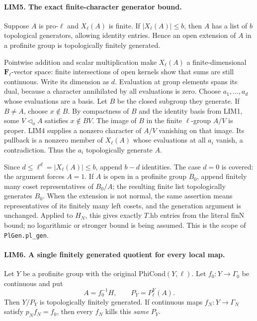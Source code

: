 \paragraph{LIM5. The exact finite-character generator bound.}
\label{claim:LIM5}
Suppose \(A\) is pro-\(\ell\) and \(X_\ell(A)\) is finite.  If
\(|X_\ell(A)|\le b\), then \(A\) has a list of \(b\) topological
generators, allowing identity entries.  Hence an open extension of
\(A\) in a profinite group is topologically finitely generated.

Pointwise addition and scalar multiplication make \(X_\ell(A)\) a
finite-dimensional \(\mathbf F_\ell\)-vector space: finite
intersections of open kernels show that sums are still continuous.
Write its dimension as \(d\).  Evaluation at group elements spans
its dual, because a character annihilated by all evaluations is zero.
Choose \(a_1,\ldots,a_d\) whose evaluations are a basis.
Let \(B\) be the closed subgroup they generate.
If \(B\ne A\), choose \(x\notin B\).  By compactness of \(B\)
and the identity basis from LIM1, some \(V\triangleleft_o A\)
satisfies \(x\notin BV\).  The image of \(B\) in the finite
\(\ell\)-group \(A/V\) is proper.  LIM4 supplies a nonzero character
of \(A/V\) vanishing on that image.  Its pullback is a nonzero member
of \(X_\ell(A)\) whose evaluations at all \(a_i\) vanish, a
contradiction.  Thus the \(a_i\) topologically generate \(A\).

Since \(d\le\ell^d=|X_\ell(A)|\le b\), append \(b-d\) identities.
The case \(d=0\) is covered: the argument forces \(A=1\).
If \(A\) is open in a profinite group \(B_0\), append finitely many
coset representatives of \(B_0/A\); the resulting finite list
topologically generates \(B_0\).  When the extension is not normal,
the same assertion means representatives of its finitely many left
cosets, and the generation argument is unchanged.
Applied to \(H_N\), this gives exactly \(T.\mathrm{hb}\) entries
from the literal \(\mathrm{finN}\) bound; no logarithmic or stronger
bound is being assumed.  This is the scope of \texttt{PlGen.pl\_gen}.

\paragraph{LIM6. A single finitely generated quotient for every local map.}
\label{claim:LIM6}
Let \(Y\) be a profinite group with the original
\(\mathrm{PhiCond}(Y,\ell)\).  Let \(f_0:Y\to\Gamma_0\) be
continuous and put
\[
 A=f_0^{-1}H,\qquad P_Y=P_\ell^Y(A).
 \tag{LIM.7}
\]
Then \(Y/P_Y\) is topologically finitely generated.
If continuous maps \(f_N:Y\to\Gamma_N\) satisfy
\(p_Nf_N=f_0\), then every \(f_N\) kills this \emph{same} \(P_Y\).

